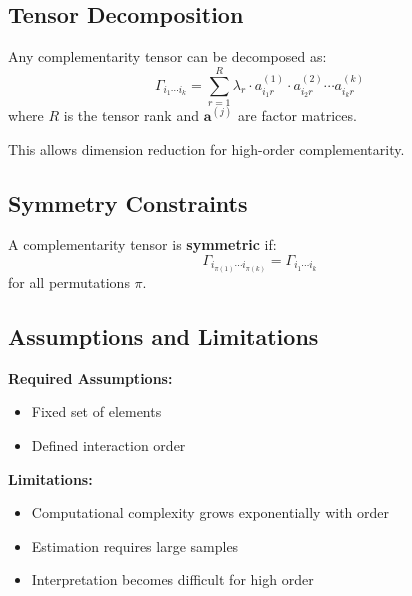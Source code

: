 \subsection{Tensor Decomposition}

\begin{theorem}[CP Decomposition]
Any complementarity tensor can be decomposed as:
\begin{equation}
\Gamma_{i_1 \cdots i_k} = \sum_{r=1}^{R} \lambda_r \cdot a^{(1)}_{i_1 r} \cdot a^{(2)}_{i_2 r} \cdots a^{(k)}_{i_k r}
\end{equation}
where $R$ is the tensor rank and $\mathbf{a}^{(j)}$ are factor matrices.
\end{theorem}

This allows dimension reduction for high-order complementarity.

\subsection{Symmetry Constraints}

\begin{definition}
A complementarity tensor is \textbf{symmetric} if:
\begin{equation}
\Gamma_{i_{\pi(1)} \cdots i_{\pi(k)}} = \Gamma_{i_1 \cdots i_k}
\end{equation}
for all permutations $\pi$.
\end{definition}

\subsection{Assumptions and Limitations}

\textbf{Required Assumptions:}
\begin{itemize}
    \item Fixed set of elements
    \item Defined interaction order
\end{itemize}

\textbf{Limitations:}
\begin{itemize}
    \item Computational complexity grows exponentially with order
    \item Estimation requires large samples
    \item Interpretation becomes difficult for high order
\end{itemize}

